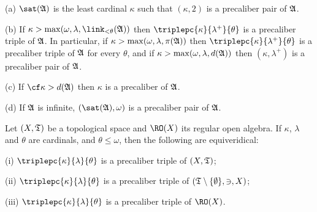 (a) $\sat(\frak A)$ is the least cardinal $\kappa$ such
that $(\kappa,2)$ is a precaliber pair of $\frak A$.

(b) If $\kappa>\max(\omega,\lambda,\link_{<\theta}(\frak A))$ then
$\triplepc{\kappa}{\lambda^+}{\theta}$ is a precaliber triple of
$\frak A$.   In particular, if
$\kappa>\max(\omega,\lambda,\pi(\frak A))$ then
$\triplepc{\kappa}{\lambda^+}{\theta}$ is a precaliber triple of
$\frak A$ for every $\theta$, and if
$\kappa>\max(\omega,\lambda,d(\frak A))$ then $(\kappa,\lambda^+)$ is a
precaliber pair of $\frak A$.

(c) If $\cf\kappa>d(\frak A)$ then $\kappa$ is a precaliber
of $\frak A$.

(d) If $\frak A$ is infinite,
$(\sat(\frak A),\omega)$ is a precaliber pair of $\frak A$.


 Let $(X,\frak T)$ be a topological space and
$\RO(X)$ its regular open algebra.   If $\kappa$, $\lambda$ and $\theta$
are cardinals, and $\theta\le\omega$, then the following are
equiveridical:

(i) $\triplepc{\kappa}{\lambda}{\theta}$ is a precaliber triple of
$(X,\frak T)$;

(ii) $\triplepc{\kappa}{\lambda}{\theta}$ is a precaliber triple of
$(\frak T\setminus\{\emptyset\},\ni,X)$;

(iii) $\triplepc{\kappa}{\lambda}{\theta}$ is a precaliber triple of
$\RO(X)$.

